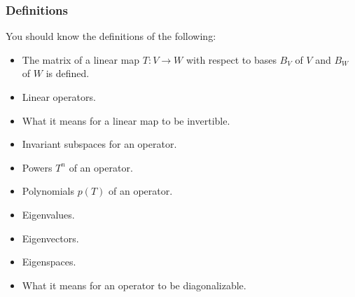 \documentclass[12pt,letterpaper]{article}
\begin{document}
\subsubsection*{Definitions}
You should know the definitions of the following:
\begin{itemize}
\item The matrix of a linear map $T:V\to W$ with respect to bases $B_V$ of $V$ and $B_W$ of $W$ is defined.
\item Linear operators.
\item What it means for a linear map to be invertible.
\item Invariant subspaces for an operator.
\item Powers $T^n$ of an operator.
\item Polynomials $p(T)$ of an operator.
\item Eigenvalues.
\item Eigenvectors.
\item Eigenspaces.
\item What it means for an operator to be diagonalizable.

\end{itemize}
\end{document}
